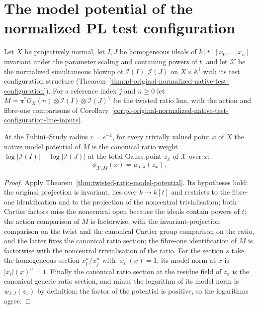 \section{The model potential of the normalized PL test configuration}

Let $X$ be projectively normal, let $I,J$ be homogeneous ideals of
$k[t][x_0,\dots,x_n]$ invariant under the parameter scaling and containing
powers of $t$, and let $\mathcal X$ be the normalized simultaneous blowup of
$\mathcal I(I),\mathcal I(J)$ on $X\times\mathbb A^1$ with its test
configuration structure
(Theorem~\ref{thm:pl-original-normalized-native-test-configuration}).  For a
reference index $j$ and $n\ge0$ let
$M=\pi^*\mathcal O_X(n)\otimes\mathcal I(I)\otimes\mathcal I(J)^\vee$ be the
twisted ratio line, with the action and fibre-one comparisons of
Corollary~\ref{cor:pl-original-normalized-native-test-configuration-line-inputs}.

\begin{theorem}
\label{thm:pl-model-potential-ratio-weight}
\leanok
At the Fubini–Study radius $r=e^{-1}$, for every trivially valued point $x$ of
$X$ the native model potential of $M$ is the canonical ratio weight
$\log|\mathcal I(I)|-\log|\mathcal I(J)|$ at the total Gauss point $z_x$ of
$\mathcal X$ over $x$:
\[
  \phi_{\mathcal X,M}(x)=w_{I,J}(z_x).
\]
\end{theorem}
\begin{proof}
Apply Theorem~\ref{thm:twisted-ratio-model-potential}.  Its hypotheses hold:
the original projection is invariant, lies over $k\to k[t]$ and restricts to
the fibre-one identification and to the projection of the noncentral
trivialisation; both Cartier factors miss the noncentral open because the
ideals contain powers of $t$; the action comparison of $M$ is factorwise,
with the invariant-projection comparison on the twist and the canonical
Cartier group comparison on the ratio, and the latter fixes the canonical
ratio section; the fibre-one identification of $M$ is factorwise with the
noncentral trivialisation of the ratio.  For the section $s$ take the
homogeneous section $x_i^n/x_j^n$ with $|x_i|(x)=1$; its model norm at $x$
is $|x_i|(x)^n=1$.  Finally the canonical ratio section at the residue field
of $z_x$ is the canonical generic ratio section, and minus the logarithm of
its model norm is $w_{I,J}(z_x)$ by definition; the factor of the potential
is positive, so the logarithms agree.
\end{proof}

